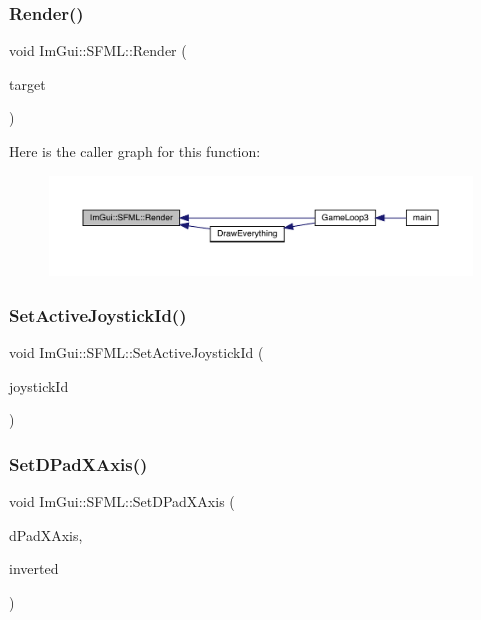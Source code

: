 \subsubsection{\texorpdfstring{Render()}{Render()}}
{\footnotesize\ttfamily void Im\+Gui\+::\+S\+F\+M\+L\+::\+Render (\begin{DoxyParamCaption}\item[{sf\+::\+Render\+Target \&}]{target }\end{DoxyParamCaption})}

Here is the caller graph for this function\+:
\nopagebreak
\begin{figure}[H]
\begin{center}
\leavevmode
\includegraphics[width=350pt]{d1/d76/namespace_im_gui_1_1_s_f_m_l_a850ba18f010cf284347e6cbc2abb8dc4_icgraph}
\end{center}
\end{figure}
\mbox{\label{namespace_im_gui_1_1_s_f_m_l_a51d36e563d2086a841e75a41ecad36b5}} 
\subsubsection{\texorpdfstring{Set\+Active\+Joystick\+Id()}{SetActiveJoystickId()}}
{\footnotesize\ttfamily void Im\+Gui\+::\+S\+F\+M\+L\+::\+Set\+Active\+Joystick\+Id (\begin{DoxyParamCaption}\item[{unsigned int}]{joystick\+Id }\end{DoxyParamCaption})}

\mbox{\label{namespace_im_gui_1_1_s_f_m_l_ad5fc8ad9c8dfddae6034e86b2a23ff99}} 
\subsubsection{\texorpdfstring{Set\+D\+Pad\+X\+Axis()}{SetDPadXAxis()}}
{\footnotesize\ttfamily void Im\+Gui\+::\+S\+F\+M\+L\+::\+Set\+D\+Pad\+X\+Axis (\begin{DoxyParamCaption}\item[{sf\+::\+Joystick\+::\+Axis}]{d\+Pad\+X\+Axis,  }\item[{bool}]{inverted }\end{DoxyParamCaption})}

